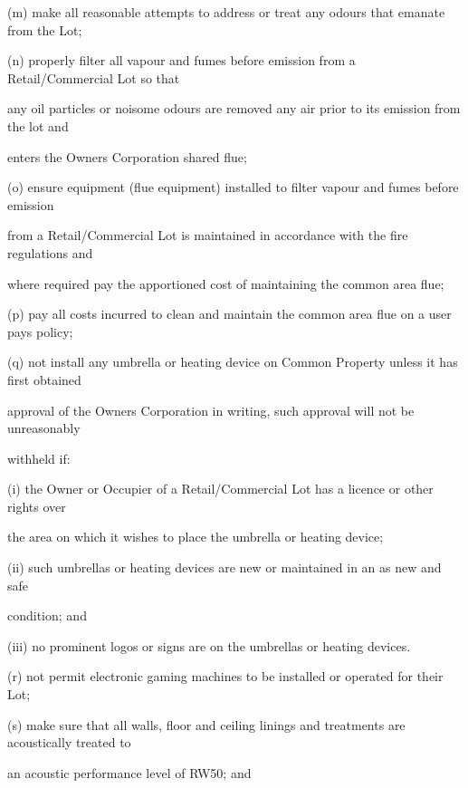 \documentclass{article}
\begin{document}
{\fontsize{9.962}{1}(m) make all reasonable attempts to address or treat any odours that emanate from the Lot; }

{\fontsize{9.962}{1}(n) properly filter all vapour and fumes before emission from a Retail/Commercial Lot so that }

{\fontsize{10.02}{1}any oil particles or noisome odours are removed any air prior to its emission from the lot and }

{\fontsize{10.02}{1}enters the Owners Corporation shared flue; }

{\fontsize{9.962}{1}(o) ensure equipment (flue equipment) installed to filter vapour and fumes before emission }

{\fontsize{10.02}{1}from a Retail/Commercial Lot is maintained in accordance with the fire regulations and }

{\fontsize{10.02}{1}where required pay the apportioned cost of maintaining the common area flue; }

{\fontsize{9.962}{1}(p) pay all costs incurred to clean and maintain the common area flue on a user pays policy; }

{\fontsize{9.962}{1}(q) not install any umbrella or heating device on Common Property unless it has first obtained }

{\fontsize{10.02}{1}approval of the Owners Corporation in writing, such approval will not be unreasonably }

{\fontsize{10.02}{1}withheld if: }

{\fontsize{9.962}{1}(i) the Owner or Occupier of a Retail/Commercial Lot has a licence or other rights over }

{\fontsize{10.02}{1}the area on which it wishes to place the umbrella or heating device; }

{\fontsize{9.962}{1}(ii) such umbrellas or heating devices are new or maintained in an as new and safe }

{\fontsize{10.02}{1}condition; and }

{\fontsize{9.962}{1}(iii) no prominent logos or signs are on the umbrellas or heating devices. }

{\fontsize{9.962}{1}(r) not permit electronic gaming machines to be installed or operated for their Lot; }

{\fontsize{9.962}{1}(s) make sure that all walls, floor and ceiling linings and treatments are acoustically treated to }

{\fontsize{10.02}{1}an acoustic performance level of RW50; and }
\end{document}
